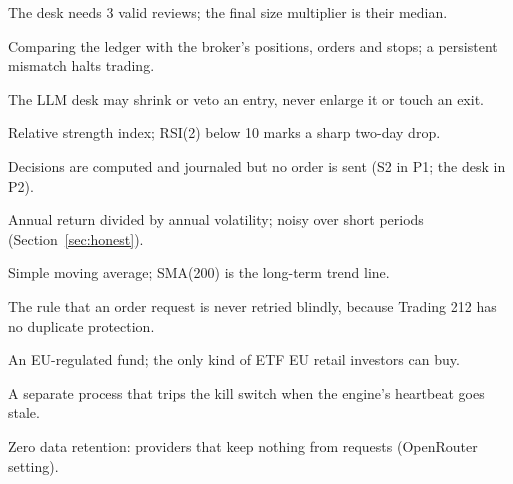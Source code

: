 \documentclass[11pt,a4paper]{article}
\begin{document}
\begin{description}[style=nextline,leftmargin=1.4em,font=\sffamily\bfseries\color{accent},itemsep=3pt]
  \item[Quorum / median] The desk needs 3 valid reviews; the final size multiplier is their median.
  \item[Reconciliation] Comparing the ledger with the broker's positions, orders and stops; a persistent mismatch halts trading.
  \item[Reduce-only] The LLM desk may shrink or veto an entry, never enlarge it or touch an exit.
  \item[RSI] Relative strength index; RSI(2) below 10 marks a sharp two-day drop.
  \item[Shadow mode] Decisions are computed and journaled but no order is sent (S2 in P1; the desk in P2).
  \item[Sharpe ratio] Annual return divided by annual volatility; noisy over short periods (Section~\ref{sec:honest}).
  \item[SMA] Simple moving average; SMA(200) is the long-term trend line.
  \item[Submit-once] The rule that an order request is never retried blindly, because Trading 212 has no duplicate protection.
  \item[UCITS ETF] An EU-regulated fund; the only kind of ETF EU retail investors can buy.
  \item[Watchdog] A separate process that trips the kill switch when the engine's heartbeat goes stale.
  \item[ZDR] Zero data retention: providers that keep nothing from requests (OpenRouter setting).
\end{description}
\end{document}
